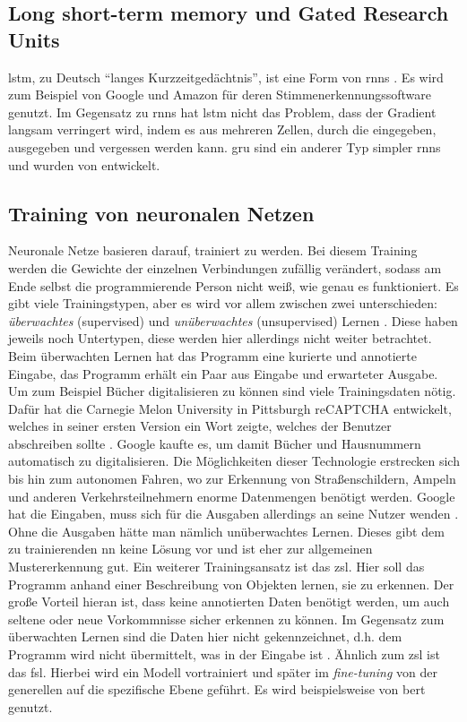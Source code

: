 \subsection[LSTMs und GRUs]{Long short-term memory und Gated Research Units}\label{sub:lstm}
\ac{lstm}, zu Deutsch \enquote{langes Kurzzeitgedächtnis}, ist eine Form von \acp{rnn} \citep{lstm}.
Es wird zum Beispiel von Google und Amazon für deren Stimmenerkennungssoftware genutzt.
Im Gegensatz zu \acp{rnn} hat \ac{lstm} nicht das Problem, dass der Gradient langsam verringert wird,
indem es aus mehreren Zellen, durch die eingegeben, ausgegeben und vergessen werden kann.
\ac{gru} sind ein anderer Typ simpler \acp{rnn} und wurden von \citet{gru} entwickelt.

\subsection{Training von neuronalen Netzen}
Neuronale Netze basieren darauf, trainiert zu werden.
Bei diesem Training werden die Gewichte der einzelnen Verbindungen zufällig verändert, sodass am Ende selbst die programmierende Person nicht weiß, wie genau es funktioniert.
Es gibt viele Trainingstypen, aber es wird vor allem zwischen zwei unterschieden: \emph{überwachtes} (supervised) und \emph{unüberwachtes} (unsupervised) Lernen \citep{mllearning}.
Diese haben jeweils noch Untertypen, diese werden hier allerdings nicht weiter betrachtet.
Beim überwachten Lernen hat das Programm eine kurierte und annotierte Eingabe, das Programm erhält ein Paar aus Eingabe und erwarteter Ausgabe.
Um zum Beispiel Bücher digitalisieren zu können sind viele Trainingsdaten nötig.
Dafür hat die Carnegie Melon University in Pittsburgh reCAPTCHA entwickelt, welches in seiner ersten Version ein Wort zeigte, welches der Benutzer abschreiben sollte \citep{recaptchabooks}.
Google kaufte es, um damit Bücher und Hausnummern automatisch zu digitalisieren.
Die Möglichkeiten dieser Technologie erstrecken sich bis hin zum autonomen Fahren, wo zur Erkennung von Straßenschildern, Ampeln und anderen Verkehrsteilnehmern enorme Datenmengen benötigt werden.
Google hat die Eingaben, muss sich für die Ausgaben allerdings an seine Nutzer wenden \citep{recaptchaav}.
Ohne die Ausgaben hätte man nämlich unüberwachtes Lernen.
Dieses gibt dem zu trainierenden \ac{nn} keine Lösung vor und ist eher zur allgemeinen Mustererkennung gut.
Ein weiterer Trainingsansatz ist das \ac{zsl}.
Hier soll das Programm anhand einer Beschreibung von Objekten lernen, sie zu erkennen.
Der große Vorteil hieran ist, dass keine annotierten Daten benötigt werden, um auch seltene oder neue Vorkommnisse sicher erkennen zu können.
Im Gegensatz zum überwachten Lernen sind die Daten hier nicht gekennzeichnet, d.h. dem Programm wird nicht übermittelt, was in der Eingabe ist \citep{zsl}.
Ähnlich zum \ac{zsl} ist das \ac{fsl}.
Hierbei wird ein Modell vortrainiert und später im \emph{fine-tuning} von der generellen auf die spezifische Ebene geführt.
Es wird beispielsweise von \ac{bert} genutzt.

